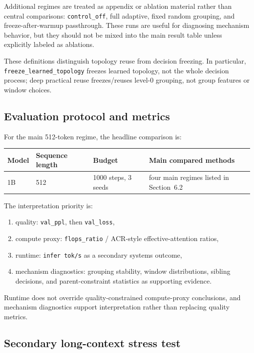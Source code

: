 \documentclass[11pt]{article}
\begin{document}
Additional regimes are treated as appendix or ablation material rather than central comparisons: \texttt{control\_off}, full adaptive, fixed random grouping, and freeze-after-warmup passthrough. These runs are useful for diagnosing mechanism behavior, but they should not be mixed into the main result table unless explicitly labeled as ablations.

These definitions distinguish topology reuse from decision freezing. In particular, \texttt{freeze\_learned\_topology} freezes learned topology, not the whole decision process; deep practical reuse freezes/reuses level-0 grouping, not group features or window choices.

\subsection{Evaluation protocol and metrics}

For the main 512-token regime, the headline comparison is:
\begin{center}
  \begin{tabularx}{\textwidth}{l l l Y}
    \toprule
    Model & Sequence length & Budget & Main compared methods \\
    \midrule
    1B & 512 & 1000 steps, 3 seeds & four main regimes listed in Section~6.2 \\
    \bottomrule
  \end{tabularx}
\end{center}

The interpretation priority is:
\begin{enumerate}
  \item quality: \texttt{val\_ppl}, then \texttt{val\_loss},
  \item compute proxy: \texttt{flops\_ratio} / ACR-style effective-attention ratios,
  \item runtime: \texttt{infer tok/s} as a secondary systems outcome,
  \item mechanism diagnostics: grouping stability, window distributions, sibling decisions, and parent-constraint statistics as supporting evidence.
\end{enumerate}
Runtime does not override quality-constrained compute-proxy conclusions, and mechanism diagnostics support interpretation rather than replacing quality metrics.

\subsection{Secondary long-context stress test}
\end{document}
